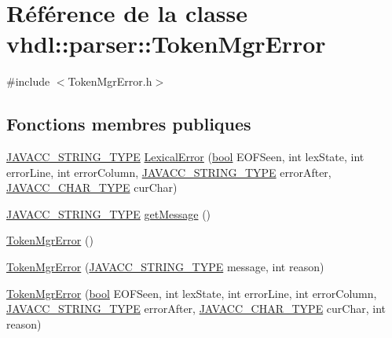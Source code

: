 \hypertarget{classvhdl_1_1parser_1_1_token_mgr_error}{}\section{Référence de la classe vhdl\+:\+:parser\+:\+:Token\+Mgr\+Error}
\label{classvhdl_1_1parser_1_1_token_mgr_error}


{\ttfamily \#include $<$Token\+Mgr\+Error.\+h$>$}

\subsection*{Fonctions membres publiques}
\begin{DoxyCompactItemize}
\item 
\hyperlink{_java_c_c_8h_a7941da0682a76ffa9869d8458e166062}{J\+A\+V\+A\+C\+C\+\_\+\+S\+T\+R\+I\+N\+G\+\_\+\+T\+Y\+P\+E} \hyperlink{classvhdl_1_1parser_1_1_token_mgr_error_af7c34fbde6a8739dd51565cc3b378530}{Lexical\+Error} (\hyperlink{qglobal_8h_a1062901a7428fdd9c7f180f5e01ea056}{bool} E\+O\+F\+Seen, int lex\+State, int error\+Line, int error\+Column, \hyperlink{_java_c_c_8h_a7941da0682a76ffa9869d8458e166062}{J\+A\+V\+A\+C\+C\+\_\+\+S\+T\+R\+I\+N\+G\+\_\+\+T\+Y\+P\+E} error\+After, \hyperlink{_java_c_c_8h_a401fffd20e03e2993f9588187b65afc3}{J\+A\+V\+A\+C\+C\+\_\+\+C\+H\+A\+R\+\_\+\+T\+Y\+P\+E} cur\+Char)
\item 
\hyperlink{_java_c_c_8h_a7941da0682a76ffa9869d8458e166062}{J\+A\+V\+A\+C\+C\+\_\+\+S\+T\+R\+I\+N\+G\+\_\+\+T\+Y\+P\+E} \hyperlink{classvhdl_1_1parser_1_1_token_mgr_error_a3f53ce23e99ff707ba37798d2d70d582}{get\+Message} ()
\item 
\hyperlink{classvhdl_1_1parser_1_1_token_mgr_error_a860806ee07d5e8223004cc4dae5386e9}{Token\+Mgr\+Error} ()
\item 
\hyperlink{classvhdl_1_1parser_1_1_token_mgr_error_aa6a0985a512482d5bba1d4a30293570c}{Token\+Mgr\+Error} (\hyperlink{_java_c_c_8h_a7941da0682a76ffa9869d8458e166062}{J\+A\+V\+A\+C\+C\+\_\+\+S\+T\+R\+I\+N\+G\+\_\+\+T\+Y\+P\+E} message, int reason)
\item 
\hyperlink{classvhdl_1_1parser_1_1_token_mgr_error_abe87f03db721798e75bde8602dc37d1f}{Token\+Mgr\+Error} (\hyperlink{qglobal_8h_a1062901a7428fdd9c7f180f5e01ea056}{bool} E\+O\+F\+Seen, int lex\+State, int error\+Line, int error\+Column, \hyperlink{_java_c_c_8h_a7941da0682a76ffa9869d8458e166062}{J\+A\+V\+A\+C\+C\+\_\+\+S\+T\+R\+I\+N\+G\+\_\+\+T\+Y\+P\+E} error\+After, \hyperlink{_java_c_c_8h_a401fffd20e03e2993f9588187b65afc3}{J\+A\+V\+A\+C\+C\+\_\+\+C\+H\+A\+R\+\_\+\+T\+Y\+P\+E} cur\+Char, int reason)
\end{DoxyCompactItemize}
